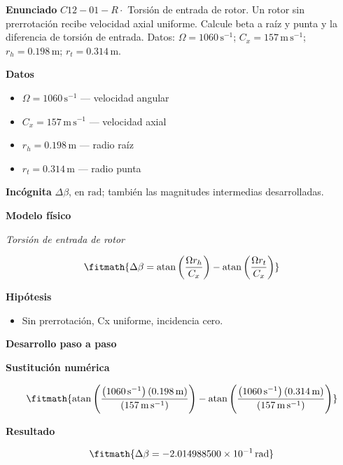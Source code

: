 \documentclass[10pt,openany]{book}
\begin{document}
\begin{tcolorbox}[title={Problema resuelto 1}, studiumworked, breakable]

\noindent\textbf{Enunciado}
\(C12-01-R \cdot\) Torsión de entrada de rotor. Un rotor sin prerrotación recibe velocidad axial uniforme. Calcule beta a raíz y punta y la diferencia de torsión de entrada. Datos: \(\Omega=1060\, \mathrm{s}^{-1}\); \(C_x=157\, \mathrm{m}\,\mathrm{s}^{-1}\); \(r_h=0.198\, \mathrm{m}\); \(r_t=0.314\, \mathrm{m}\).

\noindent\textbf{Datos}
\begin{itemize}
\item $\Omega = 1060\,\mathrm{s}^{-1}$ — velocidad angular
\item $C_x = 157\,\mathrm{m}\,\mathrm{s}^{-1}$ — velocidad axial
\item $r_h = 0.198\,\mathrm{m}$ — radio raíz
\item $r_t = 0.314\,\mathrm{m}$ — radio punta
\end{itemize}

\noindent\textbf{Incógnita}
$\Delta\beta$, en $\mathrm{rad}$; también las magnitudes intermedias desarrolladas.

\noindent\textbf{Modelo físico}

\noindent\textit{Torsión de entrada de rotor}

\[
\fitmath{\Delta\beta=\operatorname{atan}{\left(\frac{\Omega r_h}{C_x} \right)} - \operatorname{atan}{\left(\frac{\Omega r_t}{C_x} \right)}}
\]

\noindent\textbf{Hipótesis}
\begin{itemize}
\item Sin prerrotación, Cx uniforme, incidencia cero.
\end{itemize}

\noindent\textbf{Desarrollo paso a paso}



\noindent\textbf{Sustitución numérica}

\[
\fitmath{\operatorname{atan}{\left(\frac{\left(1060\,\mathrm{s}^{-1}\right) \left(0.198\,\mathrm{m}\right)}{\left(157\,\mathrm{m}\,\mathrm{s}^{-1}\right)} \right)} - \operatorname{atan}{\left(\frac{\left(1060\,\mathrm{s}^{-1}\right) \left(0.314\,\mathrm{m}\right)}{\left(157\,\mathrm{m}\,\mathrm{s}^{-1}\right)} \right)}}
\]

\noindent\textbf{Resultado}

\[
\fitmath{\Delta\beta=-2.014988500\times10^{-1}\,\mathrm{rad}}
\]


\end{tcolorbox}
\end{document}
